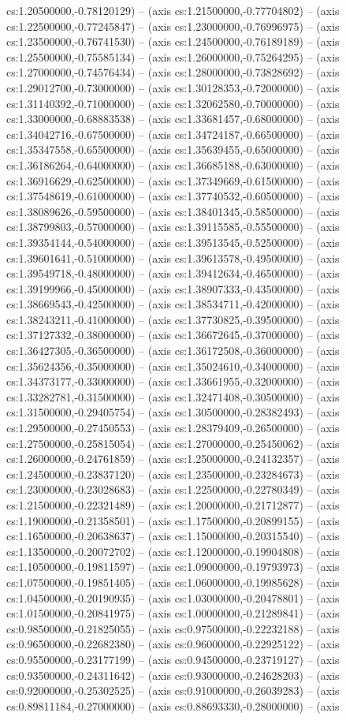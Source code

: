 cs:1.20500000,-0.78120129) -- (axis cs:1.21500000,-0.77704802) -- (axis cs:1.22500000,-0.77245847) -- (axis cs:1.23000000,-0.76996975) -- (axis cs:1.23500000,-0.76741530) -- (axis cs:1.24500000,-0.76189189) -- (axis cs:1.25500000,-0.75585134) -- (axis cs:1.26000000,-0.75264295) -- (axis cs:1.27000000,-0.74576434) -- (axis cs:1.28000000,-0.73828692) -- (axis cs:1.29012700,-0.73000000) -- (axis cs:1.30128353,-0.72000000) -- (axis cs:1.31140392,-0.71000000) -- (axis cs:1.32062580,-0.70000000) -- (axis cs:1.33000000,-0.68883538) -- (axis cs:1.33681457,-0.68000000) -- (axis cs:1.34042716,-0.67500000) -- (axis cs:1.34724187,-0.66500000) -- (axis cs:1.35347558,-0.65500000) -- (axis cs:1.35639455,-0.65000000) -- (axis cs:1.36186264,-0.64000000) -- (axis cs:1.36685188,-0.63000000) -- (axis cs:1.36916629,-0.62500000) -- (axis cs:1.37349669,-0.61500000) -- (axis cs:1.37548619,-0.61000000) -- (axis cs:1.37740532,-0.60500000) -- (axis cs:1.38089626,-0.59500000) -- (axis cs:1.38401345,-0.58500000) -- (axis cs:1.38799803,-0.57000000) -- (axis cs:1.39115585,-0.55500000) -- (axis cs:1.39354144,-0.54000000) -- (axis cs:1.39513545,-0.52500000) -- (axis cs:1.39601641,-0.51000000) -- (axis cs:1.39613578,-0.49500000) -- (axis cs:1.39549718,-0.48000000) -- (axis cs:1.39412634,-0.46500000) -- (axis cs:1.39199966,-0.45000000) -- (axis cs:1.38907333,-0.43500000) -- (axis cs:1.38669543,-0.42500000) -- (axis cs:1.38534711,-0.42000000) -- (axis cs:1.38243211,-0.41000000) -- (axis cs:1.37730825,-0.39500000) -- (axis cs:1.37127332,-0.38000000) -- (axis cs:1.36672645,-0.37000000) -- (axis cs:1.36427305,-0.36500000) -- (axis cs:1.36172508,-0.36000000) -- (axis cs:1.35624356,-0.35000000) -- (axis cs:1.35024610,-0.34000000) -- (axis cs:1.34373177,-0.33000000) -- (axis cs:1.33661955,-0.32000000) -- (axis cs:1.33282781,-0.31500000) -- (axis cs:1.32471408,-0.30500000) -- (axis cs:1.31500000,-0.29405754) -- (axis cs:1.30500000,-0.28382493) -- (axis cs:1.29500000,-0.27450553) -- (axis cs:1.28379409,-0.26500000) -- (axis cs:1.27500000,-0.25815054) -- (axis cs:1.27000000,-0.25450062) -- (axis cs:1.26000000,-0.24761859) -- (axis cs:1.25000000,-0.24132357) -- (axis cs:1.24500000,-0.23837120) -- (axis cs:1.23500000,-0.23284673) -- (axis cs:1.23000000,-0.23028683) -- (axis cs:1.22500000,-0.22780349) -- (axis cs:1.21500000,-0.22321489) -- (axis cs:1.20000000,-0.21712877) -- (axis cs:1.19000000,-0.21358501) -- (axis cs:1.17500000,-0.20899155) -- (axis cs:1.16500000,-0.20638637) -- (axis cs:1.15000000,-0.20315540) -- (axis cs:1.13500000,-0.20072702) -- (axis cs:1.12000000,-0.19904808) -- (axis cs:1.10500000,-0.19811597) -- (axis cs:1.09000000,-0.19793973) -- (axis cs:1.07500000,-0.19851405) -- (axis cs:1.06000000,-0.19985628) -- (axis cs:1.04500000,-0.20190935) -- (axis cs:1.03000000,-0.20478801) -- (axis cs:1.01500000,-0.20841975) -- (axis cs:1.00000000,-0.21289841) -- (axis cs:0.98500000,-0.21825055) -- (axis cs:0.97500000,-0.22232188) -- (axis cs:0.96500000,-0.22682380) -- (axis cs:0.96000000,-0.22925122) -- (axis cs:0.95500000,-0.23177199) -- (axis cs:0.94500000,-0.23719127) -- (axis cs:0.93500000,-0.24311642) -- (axis cs:0.93000000,-0.24628203) -- (axis cs:0.92000000,-0.25302525) -- (axis cs:0.91000000,-0.26039283) -- (axis cs:0.89811184,-0.27000000) -- (axis cs:0.88693330,-0.28000000) -- (axis 